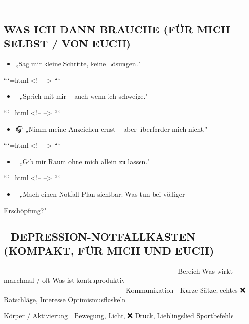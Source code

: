 -----------------------------------------------------------------------------------------------------------

\subsection{\textcolor{ctmmOrange}{\faCompass} WAS ICH DANN BRAUCHE (FÜR MICH SELBST / VON EUCH)}

\begin{itemize}
\item   \textcolor{ctmmPurple}{\faBrain} „Sag mir kleine Schritte, keine Lösungen."
\end{itemize}

```{=html}
<!-- -->
```
\begin{itemize}
\item   💬 „Sprich mit mir -- auch wenn ich schweige."
\end{itemize}

```{=html}
<!-- -->
```
\begin{itemize}
\item   🎧 „Nimm meine Anzeichen ernst -- aber überforder mich nicht."
\end{itemize}

```{=html}
<!-- -->
```
\begin{itemize}
\item   🧍 „Gib mir Raum ohne mich allein zu lassen."
\end{itemize}

```{=html}
<!-- -->
```
\begin{itemize}
\item   📎 „Mach einen Notfall-Plan sichtbar: Was tun bei völliger
\end{itemize}
Erschöpfung?"

\subsection{🧰 DEPRESSION-NOTFALLKASTEN (KOMPAKT, FÜR MICH UND EUCH)}

----------------------------------------------------------------------------
Bereich                Was wirkt manchmal / oft        Was ist
kontraproduktiv
---------------------- ------------------------------- ---------------------
Kommunikation          💬 Kurze Sätze, echtes          ❌ Ratschläge,
Interesse                       Optimismusfloskeln

Körper / Aktivierung   🚶 Bewegung, Licht,             ❌ Druck,
Lieblingslied                   Sportbefehle

